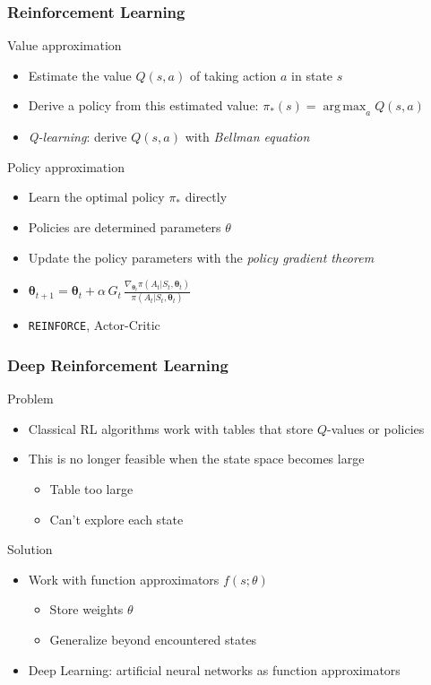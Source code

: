 \documentclass{beamer}
\DeclareMathOperator*{\argmax}{arg\,max} %
\begin{document}
\begin{frame}
\frametitle{Reinforcement Learning}
\begin{block}{Value approximation}
\begin{itemize}
    \item Estimate the value $Q(s,a) $ of taking action $a$ in state $s$
    \item Derive a policy from this estimated value: $\pi_{*}(s) = \argmax_{a} Q(s, a)$
    \item \emph{Q-learning}: derive $Q(s,a)$ with \emph{Bellman equation}
\end{itemize}
\end{block}

\begin{block}{Policy approximation}
\begin{itemize}
    \item Learn the optimal policy $\pi_{*}$ directly
    \item Policies are determined parameters $\theta$
    \item Update the policy parameters with the \emph{policy gradient theorem}
    \item $\bm{\theta}_{t+1} = \bm{\theta}_t + \alpha \, G_t \, \frac{\nabla_{\bm{\theta}_t} \pi(A_t|S_t, \bm{\theta}_t)}{\pi(A_t|S_t, \bm{\theta}_t)}$
    \item {\tt REINFORCE}, Actor-Critic
\end{itemize}
\end{block}
\end{frame}

\begin{frame}
\frametitle{Deep Reinforcement Learning}
\begin{block}{Problem}
    \begin{itemize}
    \item Classical RL algorithms work with tables that store $Q$-values or policies
    \item This is no longer feasible when the state space becomes large
    \begin{itemize}
        \item Table too large
        \item Can't explore each state
    \end{itemize}
     \end{itemize}
\end{block}
\pause
\begin{block}{Solution}
    \begin{itemize}
    \item Work with function approximators $f(s; \theta)$
    \begin{itemize}
        \item Store weights $\theta$
        \item Generalize beyond encountered states
    \end{itemize}
            
    \item \alert{Deep Learning}: artificial neural networks as function approximators
    \end{itemize}
\end{block}
\end{frame}
\end{document}
